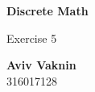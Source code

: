 \documentclass[a4paper, 12pt]{article}
\begin{document}
    \begin{center}
        \vspace*{4.4cm}
            
        \Huge
        \textbf{Discrete Math}
            
        \vspace{0.5cm}
        \LARGE
        Exercise 5

        \vfill
            
        \Large
        \textbf{Aviv Vaknin}\\316017128
                    
    \end{center}
\end{document}
